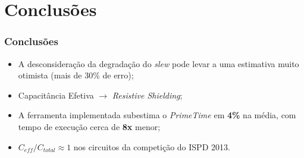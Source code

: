 \documentclass[10pt,a4paper]{beamer}
\begin{document}
		
		
	
	\section{Conclusões}
	
		\begin{frame}[t]
		\frametitle{Conclusões}
			\begin{itemize}
				\item A desconsideração da degradação do \textit{slew} pode levar a uma estimativa muito otimista (mais de 30\% de erro);
				
				\item Capacitância Efetiva $\to$ \textit{Resistive Shielding};
				
				\item A ferramenta implementada subestima o \textit{PrimeTime} em \textbf{4\%} na média, com tempo de execução  cerca de \textbf{8x} menor;
				
				\item $C_{eff} / C_{total} \approx 1$ nos circuitos da competição do ISPD 2013.
			\end{itemize}
		\end{frame}
	
%		
%				
%				
		
	\section*{}
	\frame{\titlepage}
	
\end{document}
